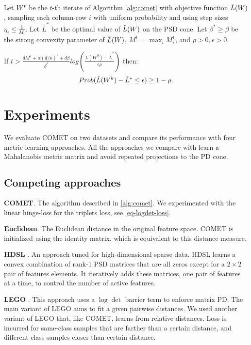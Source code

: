 \documentclass{article}
\begin{document}
\begin{theorem}
Let ${W}^t$ be the $t$-th iterate of Algorithm \ref{alg:comet} with objective function $\tilde{L}({W})$, sampling each column-row $i$ with uniform probability and using step sizes $\eta_i \leq \frac{1}{M_i}$. Let $\tilde{L}^*$ be the optimal value of $\tilde{L}({W})$ on the PSD cone. Let $\beta^* \geq \beta$ be the strong convexity parameter of $\tilde{L}({W})$, $M^1 = \max_i M^1_i$, and $\rho >0, \epsilon>0$.

If $t > \frac{d M^1 + \alpha (d/\kappa)^2 + d\beta}{\beta^*} log \left( \frac{\tilde{L}(W^0) - \tilde{L}^*}{\epsilon \rho}\right)$ then: $$Prob(\tilde{L}({W}^k) - \tilde{L}^* \leq \epsilon) \geq 1-\rho.$$
\end{theorem}


\section{Experiments}
We evaluate COMET on two datasets and compare its performance with four metric-learning approaches. All the approaches we compare with learn a Mahalanobis metric matrix and avoid repeated projections to the PD cone. 



\subsection{Competing approaches}

\textbf{COMET}. The algorithm described in \ref{alg:comet}. We experimented with the linear hinge-loss for the triplets loss, see \eqref{eq-logdet-loss}.

\textbf{Euclidean}. The Euclidean distance in the original feature space. COMET is initialized using the identity matrix, which is equivalent to this distance measure.

\textbf{HDSL} \cite{hdsl}. An approach tuned for high-dimensional sparse data. HDSL learns a convex combination of rank-1 PSD matrices that are all zeros except for a $2\times2$ pair of features elements. It iteratively adds these matrices, one pair of features at a time, to control the number of active features.

\textbf{LEGO} \cite{lego}. This approach uses a $\log \det$ barrier term to enforce matrix PD. The main variant of LEGO aims to fit a given pairwise distances. We used another variant of LEGO that, like COMET, learns from relative distances. Loss is incurred for same-class samples that are farther than a certain distance, and different-class samples closer than certain distance.
\end{document}
